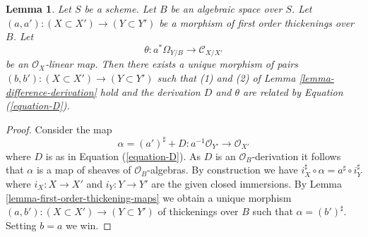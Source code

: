 \documentclass[10pt,a4paper]{amsart}
\theoremstyle{plain}
\newtheorem{lemma}[subsection]{Lemma}
\theoremstyle{definition}
\theoremstyle{remark}
\numberwithin{equation}{subsection}
\begin{document}
\begin{lemma}
\label{lemma-action-by-derivations}
Let $S$ be a scheme. Let $B$ be an algebraic space over $S$.
Let $(a, a') : (X \subset X') \to (Y \subset Y')$
be a morphism of first order thickenings over $B$.
Let
$$
\theta : a^*\Omega_{Y/B} \to \mathcal{C}_{X/X'}
$$
be an $\mathcal{O}_X$-linear map. Then there exists a unique morphism of pairs
$(b, b') : (X \subset X') \to (Y \subset Y')$ such that
(1) and (2) of
Lemma \ref{lemma-difference-derivation}
hold and the derivation $D$ and $\theta$ are related by
Equation (\ref{equation-D}).
\end{lemma}

\begin{proof}
Consider the map
$$
\alpha = (a')^\sharp + D : a^{-1}\mathcal{O}_{Y'} \to \mathcal{O}_{X'}
$$
where $D$ is as in Equation (\ref{equation-D}). As $D$ is an
$\mathcal{O}_B$-derivation it follows that $\alpha$ is a map of
sheaves of $\mathcal{O}_B$-algebras. By construction we have
$i_X^\sharp \circ \alpha = a^\sharp \circ i_Y^\sharp$ where
$i_X : X \to X'$ and $i_Y : Y \to Y'$ are the given closed immersions. By
Lemma \ref{lemma-first-order-thickening-maps}
we obtain a unique morphism
$(a, b') : (X  \subset X') \to (Y \subset Y')$ of thickenings
over $B$ such that $\alpha = (b')^\sharp$. Setting $b = a$
we win.
\end{proof}
\end{document}
